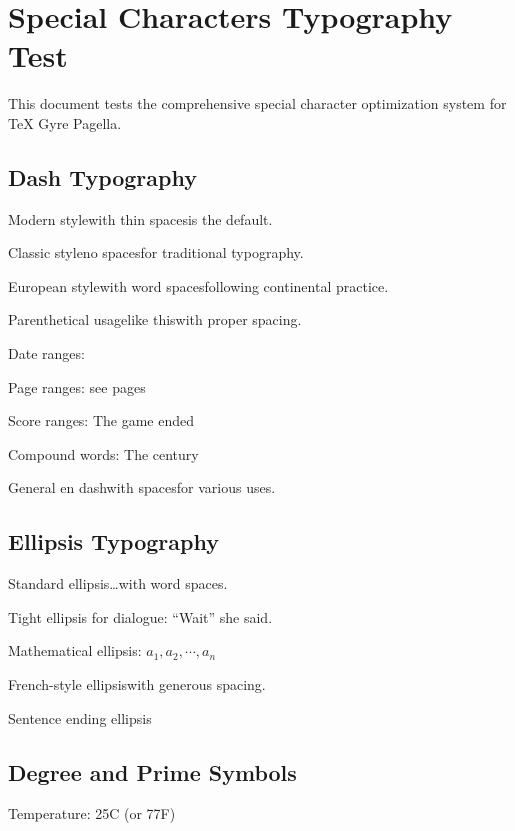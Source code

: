 \documentclass[11pt]{article}
\begin{document}
\section{Special Characters Typography Test}

This document tests the comprehensive special character optimization system for TeX Gyre Pagella.

\subsection{Dash Typography}


Modern style\emdash with thin spaces\emdash is the default.

Classic style\emdashclassic no spaces\emdashclassic for traditional typography.

European style\emdashopen with word spaces\emdashopen following continental practice.

Parenthetical usage\dashparen like this\dashparen with proper spacing.


Date ranges: 

Page ranges: see pages 

Score ranges: The game ended 

Compound words: The  century

General en dash\endash with spaces\endash for various uses.

\subsection{Ellipsis Typography}

Standard ellipsis\ldots with word spaces.

Tight ellipsis for dialogue: ``Wait\tdots'' she said.

Mathematical ellipsis: $a_1, a_2, \cdots, a_n$

French-style ellipsis\fdots with generous spacing.

Sentence ending ellipsis\edots

\subsection{Degree and Prime Symbols}

Temperature: 25\degrees C (or 77\degrees F)
\end{document}
